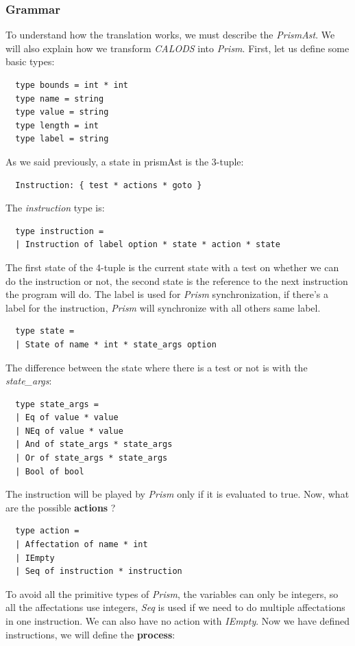 \documentclass{article}
\begin{document}
\subsubsection{Grammar}
To understand how the translation works, we must describe the \textit{PrismAst}. We will also explain how we transform \textit{CALODS} into \textit{Prism}. First, let us define some basic types:
\begin{lstlisting}
  type bounds = int * int 
  type name = string
  type value = string
  type length = int
  type label = string
\end{lstlisting}

As we said previously, a state in prismAst is the 3-tuple:
\begin{lstlisting}
  Instruction: { test * actions * goto }
\end{lstlisting}
The \textit{instruction} type is:
\begin{lstlisting}
  type instruction =
  | Instruction of label option * state * action * state
\end{lstlisting}
The first state of the 4-tuple is the current state with a test on whether we can do the instruction or not, the second state is the reference to the next instruction the program will do. The label is used for \textit{Prism} synchronization, if there's a label for the instruction, \textit{Prism} will synchronize with all others same label.
\begin{lstlisting}
  type state =
  | State of name * int * state_args option
\end{lstlisting}
The difference between the state where there is a test or not is with the \textit{state_args}:
\begin{lstlisting}
  type state_args =
  | Eq of value * value
  | NEq of value * value
  | And of state_args * state_args
  | Or of state_args * state_args
  | Bool of bool
\end{lstlisting}
The instruction will be played by \textit{Prism} only if it is evaluated to true. Now, what are the possible \textbf{actions} ?
\begin{lstlisting}
  type action = 
  | Affectation of name * int
  | IEmpty
  | Seq of instruction * instruction
\end{lstlisting}
To avoid all the primitive types of \textit{Prism}, the variables can only be integers, so all the affectations use integers, \textit{Seq} is used if we need to do multiple affectations in one instruction. We can also have no action with \textit{IEmpty}. Now we have defined instructions, we will define the \textbf{process}:
\end{document}
